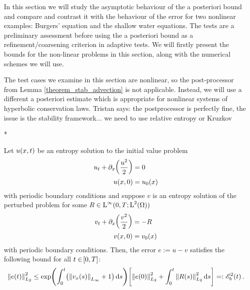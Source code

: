 \documentclass[final]{amsart}
\newcommand{\tristan}[1]{{\color{purple} Tristan says:  #1 }}
\numberwithin{equation}{section}
\begin{document}
In this section we will study the asymptotic behaviour of the a
posteriori bound and compare and contrast it with the behaviour of the
error for two nonlinear examples: Burgers' equation and the shallow
water equations. The tests are a preliminary assessment before using
the a posteriori bound as a refinement/coarsening criterion in
adaptive tests.  We will firstly present the bounds for the non-linear
problems in this section, along with the numerical schemes we will
use.

\begin{Rem}
 The test cases we examine in this section are nonlinear, so the
 post-processor from Lemma \ref{theorem_stab_advection} is not
 applicable.  Instead, we will use a different a posteriori estimate
 which is appropriate for nonlinear systems of hyperbolic conservation
 laws. \tristan{the postprocessor is perfectly fine, the issue is the
   stability framework... we need to use relative entropy or Kruzkov}
\end{Rem}
\/*
\begin{Lem}\label{theorem_stab_burgers}
Let $u\!\left({x,t}\right)$ be an entropy solution to the initial value problem 
\begin{equation}
\begin{aligned}
u_t+\partial_x\!\left({\frac{u^2}{2}}\right)&=0\\
u\!\left({x,0}\right)&=u_0\!\left({x}\right)
\end{aligned}
\end{equation}
with periodic boundary conditions and suppose $v$ is an entropy
solution of the perturbed problem for some $R \in \operatorname L^{\infty}(0,T;
\operatorname L^{2}(\Omega))$
\begin{equation}
\begin{aligned}
v_t+\partial_x\!\left({\frac{v^2}{2}}\right)&=-R\\
v\!\left({x,0}\right)&=v_0\!\left({x}\right)
\end{aligned}
\end{equation}
with periodic boundary conditions. Then, the error $e:=u-v$ satisfies
the following bound for all $t\in\!\left[{0,T}\right]$:
\begin{equation}
\begin{aligned}
\Norm{e\qp{t}}^2_{L_2}\leq \exp\qp{\int_0^t\qp{\Norm{v_x\qp{s}}_{L_\infty}+1}\mathrm{d}s}\qb{\Norm{e\qp{0}}_{L_2}^2+\int_0^t\Norm{R\qp{s}}^2_{L_2}\mathrm{d}s}=: \cE_b^2\qp{t}.
\end{aligned}
\end{equation}
\end{Lem}
\end{document}
